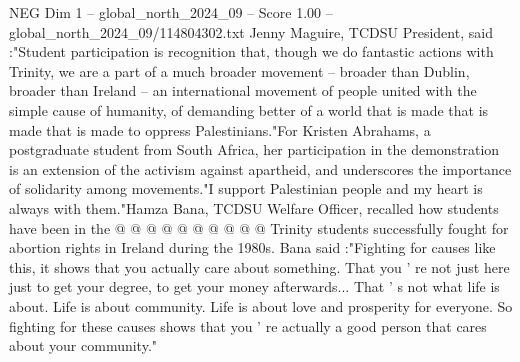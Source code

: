 \begin{textsample}{NEG Dim 1 – global\_north\_2024\_09 – Score 1.00 – global\_north\_2024\_09/114804302.txt}
Jenny Maguire, TCDSU President, said :"Student participation is recognition that, though we do fantastic actions with Trinity, we are a part of a much broader movement -- broader than Dublin, broader than Ireland -- an international movement of people united with the simple cause of humanity, of demanding better of a world that is made that is made that is made to oppress Palestinians."For Kristen Abrahams, a postgraduate student from South Africa, her participation in the demonstration is an extension of the activism against apartheid, and underscores the importance of solidarity among movements."I support Palestinian people and my heart is always with them."Hamza Bana, TCDSU Welfare Officer, recalled how students have been in the @ @ @ @ @ @ @ @ @ @ Trinity students successfully fought for abortion rights in Ireland during the 1980s.
Bana said :"Fighting for causes like this, it shows that you actually care about something.
That you ' re not just here just to get your degree, to get your money afterwards...
That ' s not what life is about.
Life is about community.
Life is about love and prosperity for everyone.
So fighting for these causes shows that you ' re actually a good person that cares about your community."

\end{textsample}
